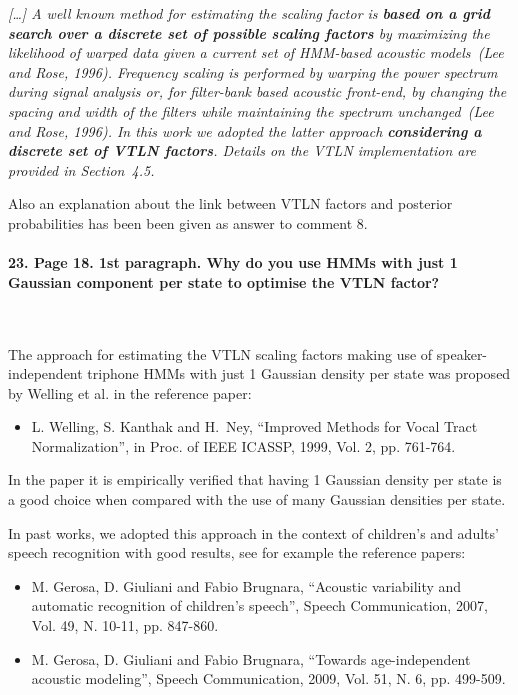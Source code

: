 \documentclass[]{article}
\begin{document}
\textit{[\dots] A  well  known  method  for estimating  the scaling  factor is \textbf{ based on  a  grid search  over a  discrete set  of possible scaling  factors} by maximizing the likelihood  of warped data given  a  current set  of  HMM-based acoustic  models~(Lee and Rose, 1996). Frequency scaling  is performed by  warping the power  spectrum during signal  analysis  or, for  filter-bank  based  acoustic front-end,  by changing the  spacing and width  of the filters while  maintaining the spectrum  unchanged~(Lee and Rose, 1996). In  this  work we  adopted  the latter approach \textbf{considering a discrete set of VTLN factors}. Details on the VTLN implementation  are provided in Section~4.5.}

Also an explanation about the link between VTLN factors and posterior probabilities has been been given as answer to comment 8.

\paragraph{23. Page 18. 1st paragraph. Why do you use HMMs with just 1 Gaussian component per state to optimise the VTLN factor? }

~

The   approach  for  estimating   the  VTLN   scaling factors  making   use  of
speaker-independent  triphone  HMMs  with  just 1 Gaussian density  per  state  was
proposed by Welling et al. in the reference paper:
\begin{itemize}
\item L. Welling, S. Kanthak and  H.~Ney, ``Improved Methods for Vocal Tract                                              
Normalization'', in Proc. of IEEE ICASSP, 1999, Vol. 2, pp. 761-764.
\end{itemize}

In the paper it is empirically verified that having 1 Gaussian density
per state is a good  choice when compared
with the use of many Gaussian densities per state.

In past works, we  adopted this approach  in the context  of children's
and adults' speech recognition  with good results,  see for example  the reference
papers:

\begin{itemize}
\item M. Gerosa, D. Giuliani  and Fabio Brugnara, ``Acoustic variability and
automatic recognition of children's speech'', Speech Communication,
2007, Vol. 49, N. 10-11, pp. 847-860.
\item M. Gerosa, D. Giuliani and Fabio Brugnara, ``Towards age-independent acoustic modeling'',
Speech Communication, 2009, Vol. 51, N. 6, pp. 499-509.
\end{itemize}
\end{document}
